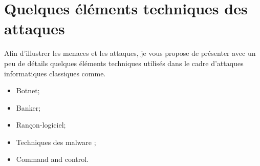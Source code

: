 %

\section{Quelques éléments techniques des attaques}

Afin d'illustrer les menaces et les attaques, je vous propose de présenter  avec un peu de détails quelques éléments techniques utilisés dans le cadre d'attaques informatiques classiques comme.

\begin{itemize}
  \item Botnet;
  \item Banker;
  \item Rançon-logiciel;
  \item  Techniques des malware ;
  \item Command and control.
\end{itemize}




